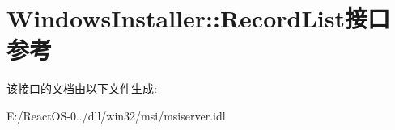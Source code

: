 \hypertarget{interface_windows_installer_1_1_record_list}{}\section{Windows\+Installer\+:\+:Record\+List接口 参考}
\label{interface_windows_installer_1_1_record_list}


该接口的文档由以下文件生成\+:\begin{DoxyCompactItemize}
\item 
E\+:/\+React\+O\+S-\/0../dll/win32/msi/msiserver.\+idl\end{DoxyCompactItemize}
